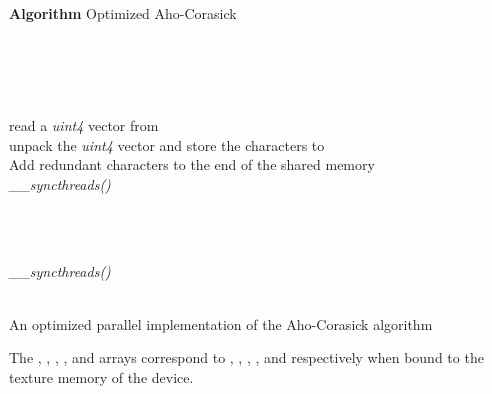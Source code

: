\documentclass{ws-ijait}
\begin{document}
\begin{algorithm}[h]

\textbf{Algorithm} Optimized Aho-Corasick\\

\\
\\
\\
\\


\For {  } {

	\For {  } {
		\If {  } {
			read a \textit{uint4} vector from \\
			unpack the \textit{uint4} vector and store the  characters to \\
		}
	}
	Add  redundant characters to the end of the shared memory\\
	\textit{\_\_syncthreads()}\\
		
	\\
	
	 {
		
			\While{  }{
			
				\\
			}
	
			\\
	}
	
	\textit{\_\_syncthreads()}\\
}
\\

\caption{An optimized parallel implementation of the Aho-Corasick algorithm}
\label{compl:cuda_AC_optimized_implementation}
\end{algorithm}

The , , , ,  and  arrays correspond to , , , ,  and  respectively when bound to the texture memory of the device. \\
\end{document}
